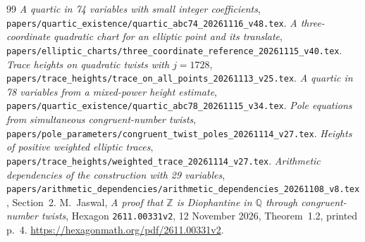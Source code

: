 \documentclass[11pt,a4paper]{article}
\newcommand{\Q}{\mathbb Q}\newcommand{\Z}{\mathbb Z}
\begin{document}
\begin{thebibliography}{99}
\emph{A quartic in 74 variables with small integer coefficients},
\nolinkurl{papers/quartic_existence/quartic_abc74_20261116_v48.tex}.
\emph{A three-coordinate quadratic chart for an elliptic point and its translate},
\nolinkurl{papers/elliptic_charts/three_coordinate_reference_20261115_v40.tex}.
\emph{Trace heights on quadratic twists with $j=1728$},
\nolinkurl{papers/trace_heights/trace_on_all_points_20261113_v25.tex}.
\emph{A quartic in 78 variables from a mixed-power height estimate},
\nolinkurl{papers/quartic_existence/quartic_abc78_20261115_v34.tex}.
\emph{Pole equations from simultaneous congruent-number twists},
\nolinkurl{papers/pole_parameters/congruent_twist_poles_20261114_v27.tex}.
\emph{Heights of positive weighted elliptic traces},
\nolinkurl{papers/trace_heights/weighted_trace_20261114_v27.tex}.
\emph{Arithmetic dependencies of the construction with 29 variables},
\nolinkurl{papers/arithmetic_dependencies/arithmetic_dependencies_20261108_v8.tex},
Section~2.
 M.~Jaswal, \emph{A proof that $\Z$ is Diophantine in $\Q$
through congruent-number twists}, Hexagon \texttt{2611.00331v2},
12 November 2026, Theorem~1.2, printed p.~4.
\url{https://hexagonmath.org/pdf/2611.00331v2}.
\end{thebibliography}
\end{document}
